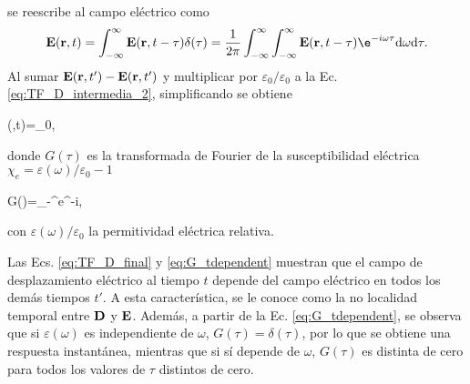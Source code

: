 se reescribe al campo eléctrico como
\begin{equation}
	\vb{E}(\vb{r},t)=\int_{-\infty}^{\infty}\vb{E}(\vb{r},t-\tau)\delta(\tau)=\frac{1}{2\pi}\int_{-\infty}^{\infty}\int_{-\infty}^{\infty}\vb{E}(\vb{r},t-\tau)\e^{-i\omega\tau}\text{d}\omega\text{d}\tau.
\end{equation}
%
Al sumar $\vb{E}(\vb{r},t')-\vb{E}(\vb{r},t')$ y multiplicar por $\varepsilon_0/\varepsilon_0$ a la Ec. \eqref{eq:TF_D_intermedia_2}, simplificando se obtiene
%
\begin{tcolorbox}
		(,t)=\varepsilon_0,\label{eq:TF_D_final} 
\end{tcolorbox}
%
\noindent donde $G(\tau)$ es la transformada de Fourier de la susceptibilidad eléctrica $\chi_e=\varepsilon(\omega)/\varepsilon_0-1$ \cite{jacksonClassicalElectrodynamics2021a}
%
\begin{tcolorbox}
	G(\tau)=\int_{-\infty}^{\infty}e^{-i\omega\tau}\omega,
	\label{eq:G_tdependent} 
\end{tcolorbox}
%
\noindent con $\varepsilon(\omega)/\varepsilon_0$ la permitividad eléctrica relativa.

\noindent Las Ecs. \eqref{eq:TF_D_final} y \eqref{eq:G_tdependent} muestran que el campo de desplazamiento eléctrico al tiempo $t$ depende del campo eléctrico en todos los demás tiempos $t'$. A esta característica, se le conoce como la no localidad temporal entre $\vb{D}$ y $\vb{E}$. Además, a partir de la Ec. \eqref{eq:G_tdependent}, se observa que si $\varepsilon(\omega)$ es independiente de $\omega$, $G(\tau)=\delta(\tau)$, por lo que se obtiene una respuesta instantánea, mientras que si sí depende de $\omega$, $G(\tau)$ es distinta de cero para todos los valores de $\tau$ distintos de cero.

